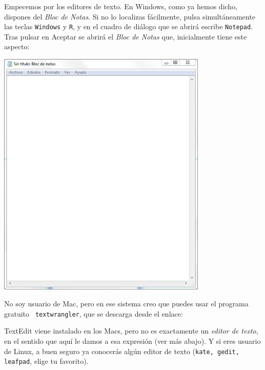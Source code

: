 \documentclass[10pt,a4paper]{article}\usepackage[]{graphicx}\usepackage[]{color}
\begin{document}
Empecemos por los editores de texto. En Windows, como ya hemos dicho, dispones del {\em Bloc de
Notas}. Si no lo localizas fácilmente, pulsa simultáneamente las teclas {\tt Windows} y {\tt R}, y
en el cuadro de diálogo que se abrirá escribe {\tt Notepad}. Tras pulsar en Aceptar se abrirá el
{\em Bloc de Notas} que, inicialmente tiene este aspecto:
\begin{center}
\includegraphics[width=10cm]{../fig/Tut00-BlocDeNotas.png}
\end{center}
No soy usuario de Mac, pero en ese sistema creo que puedes usar el programa gratuito {\tt
textwrangler}, que se descarga desde el enlace:
      \begin{center}
      \end{center}
TextEdit viene instalado en los Macs, pero no es exactamente un {\em editor de texto}, en el
sentido que aquí le damos a esa expresión (ver más abajo). Y si eres usuario de Linux, a buen
seguro ya conocerás algún editor de texto ({\tt kate, gedit, leafpad}, elige tu favorito).
\end{document}
